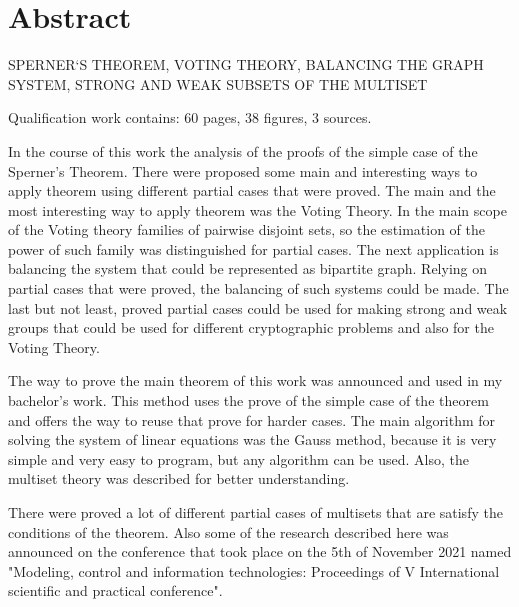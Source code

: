 \chapter*{Abstract}

\MakeUppercase{Sperner`s theorem, voting theory, balancing the graph system, strong and weak subsets of the multiset}

Qualification work contains: 60 pages, 38 figures, 3 sources.

	In the course of this work the analysis of the proofs of the simple case of the Sperner's Theorem. There were proposed some main and interesting ways to apply theorem using different partial cases that were proved. The main and the most interesting way to apply theorem was the Voting Theory. In the main scope of the Voting theory families of pairwise disjoint sets, so the estimation of the power of such family was distinguished for partial cases. The next application is balancing the system that could be represented as bipartite graph. Relying on partial cases that were proved, the balancing of such systems could be made. The last but not least, proved partial cases could be used for making strong and weak groups that could be used for different cryptographic problems and also for the Voting Theory.
	
	The way to prove the main theorem of this work was announced and used in my bachelor's work. This method uses the prove of the simple case of the theorem and offers the way to reuse that prove for harder cases. The main algorithm for solving the system of linear equations was the Gauss method, because it is very simple and very easy to program, but any algorithm can be used. Also, the multiset theory was described for better understanding. 

	There were proved a lot of different partial cases of multisets that are satisfy the conditions of the theorem. Also some of the research described here was announced on the conference that took place on the 5th of November 2021 named "Modeling, control and information technologies: Proceedings of V International scientific and practical conference".